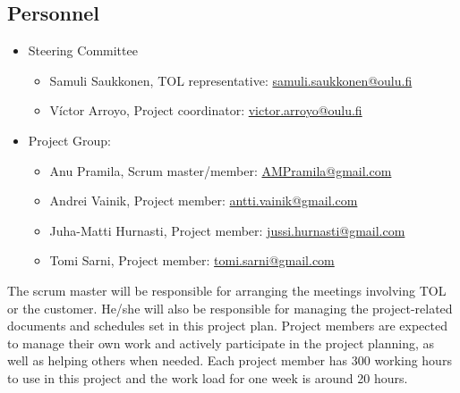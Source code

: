 \documentclass[12pt,titlepage,a4paper]{article}
\begin{document}
	\subsection{Personnel}
		\begin{itemize}
		\item Steering Committee
			\begin{itemize}
				\item Samuli Saukkonen, TOL representative:  \href{mailto:samuli.saukkonen@oulu.fi}{samuli.saukkonen@oulu.fi}
				\item Víctor Arroyo, Project coordinator: \href{mailto:victor.arroyo@oulu.fi}{victor.arroyo@oulu.fi}
			\end{itemize}
		
		\item Project Group:
			\begin{itemize}
				\item Anu Pramila, Scrum master/member: \href{mailto:AMPramila@gmail.com}{AMPramila@gmail.com}
				\item Andrei Vainik, Project member: \href{mailto:antti.vainik@gmail.com}{antti.vainik@gmail.com}
				\item Juha-Matti Hurnasti, Project member: \href{mailto:jussi.hurnasti@gmail.com}{jussi.hurnasti@gmail.com}
				\item Tomi Sarni, Project member: \href{mailto:tomi.sarni@gmail.com}{tomi.sarni@gmail.com}
			\end{itemize}
		\end{itemize}
		
		The scrum master will be responsible for arranging the meetings involving TOL or the customer.
		He/she will also be responsible for managing the project-related documents and schedules set in this project plan.
		Project members are expected to manage their own work and actively participate in the project planning, as well as 			helping others when needed.
		Each project member has 300 working hours to use in this project and the work load for one week is around 20 hours.
	
		
\end{document}
